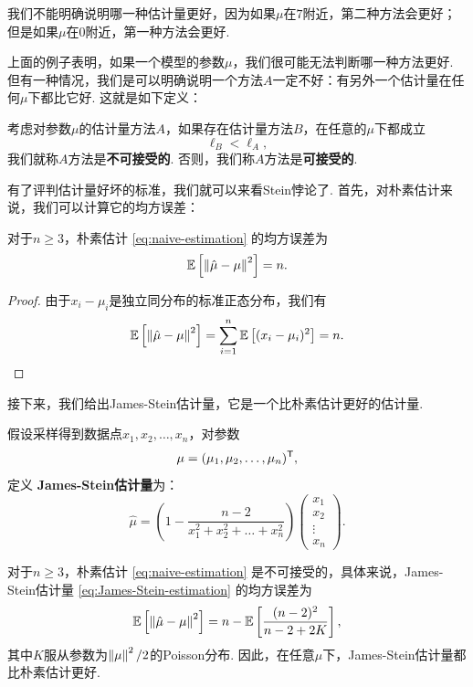 我们不能明确说明哪一种估计量更好，因为如果$\mu$在$7$附近，第二种方法会更好；但是如果$\mu$在$0$附近，第一种方法会更好. 

上面的例子表明，如果一个模型的参数$\mu$，我们很可能无法判断哪一种方法更好. 但有一种情况，我们是可以明确说明一个方法$A$一定不好：有另外一个估计量在任何$\mu$下都比它好. 这就是如下定义：

\begin{definition}[可接受性]
考虑对参数$\mu$的估计量方法$A$，如果存在估计量方法$B$，在任意的$\mu$下都成立
\[\ell_B < \ell_A,\]
我们就称$A$方法是\textbf{不可接受的}. 否则，我们称$A$方法是\textbf{可接受的}. 
\end{definition}

有了评判估计量好坏的标准，我们就可以来看Stein悖论了. 首先，对朴素估计来说，我们可以计算它的均方误差：

\begin{lemma}\label{lemma:naive-estimation}
    对于$n\geq 3$，朴素估计 \eqref{eq:naive-estimation} 的均方误差为
    \[\mathbb{E}\left[\left\|\hat{\mu}-\mu\right\|^2\right] = n.\]
\end{lemma}
\begin{proof}
    由于$x_i-\mu_i$是独立同分布的标准正态分布，我们有
    \[\mathbb{E}\left[\left\|\hat{\mu}-\mu\right\|^2\right] = \sum_{i=1}^n\mathbb{E}\left[(x_i-\mu_i)^2\right] = n.\]
\end{proof}

接下来，我们给出James-Stein估计量，它是一个比朴素估计更好的估计量.

\begin{definition}
假设采样得到数据点$x_1,x_2,\dots,x_n$，对参数
\[\mu=(\mu_1,\mu_2,\dots,\mu_n)^{\mathsf{T}},\]
定义 \textbf{James-Stein估计量}为：
\begin{equation}
    \hat{\mu} = \left(1 - \frac{n-2}{x_1^2+x_2^2+\dots+x_n^2}\right)\begin{pmatrix}
        x_1 \\ x_2 \\ \vdots \\ x_n
        \end{pmatrix}.\label{eq:James-Stein-estimation}        
\end{equation}
\end{definition}

\begin{theorem}[Stein悖论]\label{theorem:stein-paradox}
    对于$n\geq 3$，朴素估计 \eqref{eq:naive-estimation} 是不可接受的，具体来说，James-Stein估计量 \eqref{eq:James-Stein-estimation} 的均方误差为
    \[\mathbb{E}\left[\left\|\hat{\mu}-\mu\right\|^2\right] = n-\mathbb{E}\left[\frac{(n-2)^2}{n-2+2K}\right],\]
    其中$K$服从参数为$\left\|\mu\right\|^2/2$的Poisson分布. 因此，在任意$\mu$下，James-Stein估计量都比朴素估计更好. 
\end{theorem}

